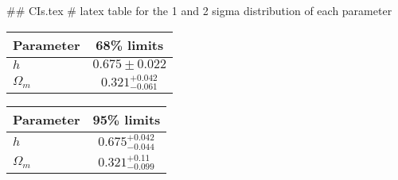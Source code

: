 ## CIs.tex
# latex table for the 1 and 2 sigma distribution of each parameter

\begin{tabular} { l  c}
 Parameter &  68\% limits\\
\hline
{\boldmath$h              $} & $0.675\pm 0.022            $\\
{\boldmath$\Omega_m       $} & $0.321^{+0.042}_{-0.061}   $\\
\hline
\end{tabular}

\begin{tabular} { l  c}
 Parameter &  95\% limits\\
\hline
{\boldmath$h              $} & $0.675^{+0.042}_{-0.044}   $\\
{\boldmath$\Omega_m       $} & $0.321^{+0.11}_{-0.099}    $\\
\hline
\end{tabular}
